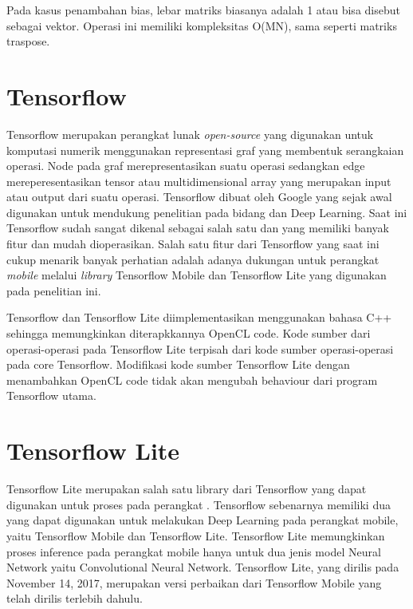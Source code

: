 Pada kasus penambahan bias, lebar matriks biasanya adalah 1 atau bisa disebut sebagai vektor. Operasi ini memiliki kompleksitas O(MN), sama seperti matriks traspose.


\section{Tensorflow}
Tensorflow merupakan perangkat lunak \textit{open-source} yang digunakan untuk komputasi numerik menggunakan representasi graf yang membentuk serangkaian operasi. Node pada graf merepresentasikan suatu operasi sedangkan edge mereperesentasikan tensor atau multidimensional array yang merupakan input atau output dari suatu operasi. Tensorflow dibuat oleh Google yang sejak awal digunakan untuk mendukung penelitian pada bidang \ml dan Deep Learning. Saat ini Tensorflow sudah sangat dikenal sebagai salah satu \framework \ml dan \deeplearning yang memiliki banyak fitur dan mudah dioperasikan. Salah satu fitur dari Tensorflow yang saat ini cukup menarik banyak perhatian adalah adanya dukungan untuk perangkat \textit{mobile} melalui \textit{library} Tensorflow Mobile dan Tensorflow Lite yang digunakan pada penelitian ini.

Tensorflow dan Tensorflow Lite diimplementasikan menggunakan bahasa C++ sehingga memungkinkan diterapkkannya OpenCL code. Kode sumber dari operasi-operasi \deeplearning \inference pada Tensorflow Lite terpisah dari kode sumber operasi-operasi \deeplearning \inference pada core Tensorflow. Modifikasi kode sumber Tensorflow Lite dengan menambahkan OpenCL code tidak akan mengubah behaviour dari program Tensorflow utama.

\section{Tensorflow Lite}
Tensorflow Lite merupakan salah satu library dari Tensorflow yang dapat digunakan untuk proses \deeplearning \inference pada perangkat \mobile. Tensorflow sebenarnya memiliki dua \library yang dapat digunakan untuk melakukan Deep Learning \inference pada perangkat mobile, yaitu Tensorflow Mobile dan Tensorflow Lite. Tensorflow Lite memungkinkan proses inference pada perangkat mobile hanya untuk dua jenis model Neural Network yaitu Convolutional Neural Network. Tensorflow Lite, yang dirilis pada November 14, 2017, merupakan versi perbaikan dari Tensorflow Mobile yang telah dirilis terlebih dahulu.

